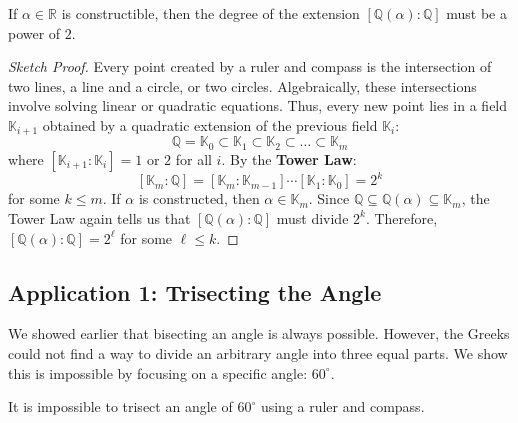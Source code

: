 \begin{theorem}
If $\alpha \in \mathbb{R}$ is constructible, then the degree of the extension $[\mathbb{Q}(\alpha) : \mathbb{Q}]$ must be a power of $2$. 
\end{theorem}

\begin{proof}[Sketch Proof]
Every point created by a ruler and compass is the intersection of two lines, a line and a circle, or two circles. Algebraically, these intersections involve solving linear or quadratic equations. Thus, every new point lies in a field $\mathbb{K}_{i+1}$ obtained by a quadratic extension of the previous field $\mathbb{K}_i$:
\[ \mathbb{Q} = \mathbb{K}_0 \subset \mathbb{K}_1 \subset \mathbb{K}_2 \subset \dots \subset \mathbb{K}_m \]
where $[\mathbb{K}_{i+1} : \mathbb{K}_i] = 1$ or $2$ for all $i$. By the \textbf{Tower Law}:
\[ [\mathbb{K}_m : \mathbb{Q}] = [\mathbb{K}_m : \mathbb{K}_{m-1}] \cdots [\mathbb{K}_1 : \mathbb{K}_0] = 2^k \]
for some $k \leq m$. If $\alpha$ is constructed, then $\alpha \in \mathbb{K}_m$. Since $\mathbb{Q} \subseteq \mathbb{Q}(\alpha) \subseteq \mathbb{K}_m$, the Tower Law again tells us that $[\mathbb{Q}(\alpha) : \mathbb{Q}]$ must divide $2^k$. Therefore, $[\mathbb{Q}(\alpha) : \mathbb{Q}] = 2^{\ell}$ for some $\ell \le k$.
\end{proof}


\subsection{Application 1: Trisecting the Angle}

We showed earlier that bisecting an angle is always possible. However, the Greeks could not find a way to divide an arbitrary angle into three equal parts. We show this is impossible by focusing on a specific angle: $60^\circ$.

\begin{proposition}
It is impossible to trisect an angle of $60^\circ$ using a ruler and compass.
\end{proposition}

